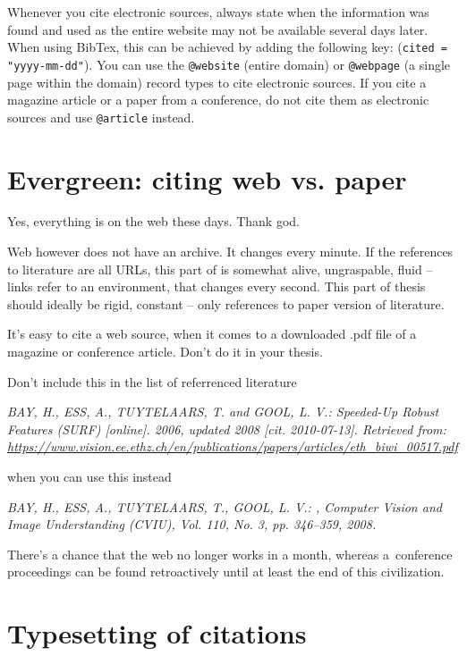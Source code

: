 Whenever you cite electronic sources, always state when the information was found and used as the entire website may not be available several days later. When using BibTex, this can be achieved by adding the following key: (\verb|cited = "yyyy-mm-dd"|). You can use the \verb|@website| (entire domain) or \verb|@webpage| (a single page within the domain) record types to cite electronic sources. If you cite a magazine article or a paper from a conference, do not cite them as electronic sources and use \verb|@article| instead.

\section{Evergreen: citing web vs. paper}

Yes, everything is on the web these days. Thank god.

Web however does not have an archive. It changes every minute. If the references to literature are all URLs, this part of is somewhat alive, ungraspable, fluid -- links refer to an environment, that changes every second. This part of thesis should ideally be rigid, constant -- only references to paper version of literature.

It's easy to cite a web source, when it comes to a downloaded .pdf file of a magazine or conference article. Don't do it in your thesis.
\bigskip

\noindent Don't include this in the list of referrenced literature

\noindent \it BAY, H., ESS, A., TUYTELAARS, T. and GOOL, L. V.: Speeded-Up Robust Features (SURF) [online]. 2006, updated 2008 [cit. 2010-07-13]. Retrieved from: \url{https://www.vision.ee.ethz.ch/en/publications/papers/articles/eth_biwi_00517.pdf}
\bigskip
\rm

\noindent when you can use this instead

\noindent \it BAY, H., ESS, A., TUYTELAARS, T., GOOL, L. V.: , Computer Vision and Image Understanding (CVIU), Vol. 110, No. 3, pp. 346–359, 2008.
\bigskip
\rm

There's a chance that the web no longer works in a month, whereas a~conference proceedings can be found retroactively until at least the end of this civilization.


\section{Typesetting of citations}

